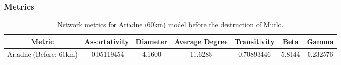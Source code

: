 \documentclass[12pt,a4paper]{thesis}
\begin{document}
\subsubsection{Metrics}


\begin{table}[H]
\centering
\caption{Network metrics for Ariadne (60km) model before the destruction of Murlo.}
\tiny
\begin{tabular}{|c|c|c|c|c|c|c|}
\hline Metric & Assortativity & Diameter & Average Degree & Transitivity & Beta & Gamma \\ 
\hline Ariadne (Before: 60km) & -0.05119454	& 4.1600 & 11.6288 & 0.70893446 & 5.8144 & 0.232576\\ 
\hline 
\end{tabular} 
\label{tab:ariadneNetBefore60}
\end{table}
\end{document}
